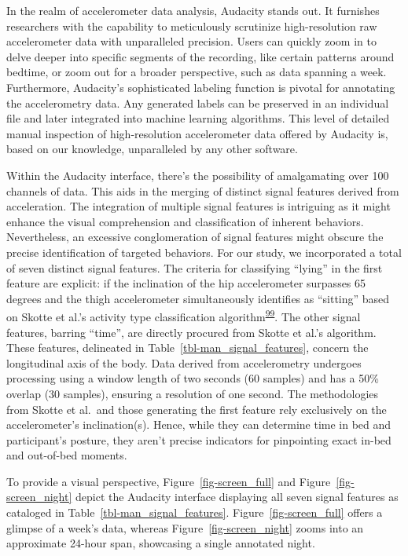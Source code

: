 \documentclass[
  9pt,
]{scrbook}
\begin{document}
In the realm of accelerometer data analysis, Audacity stands out. It
furnishes researchers with the capability to meticulously scrutinize
high-resolution raw accelerometer data with unparalleled precision.
Users can quickly zoom in to delve deeper into specific segments of the
recording, like certain patterns around bedtime, or zoom out for a
broader perspective, such as data spanning a week. Furthermore,
Audacity's sophisticated labeling function is pivotal for annotating the
accelerometry data. Any generated labels can be preserved in an
individual file and later integrated into machine learning algorithms.
This level of detailed manual inspection of high-resolution
accelerometer data offered by Audacity is, based on our knowledge,
unparalleled by any other software.

Within the Audacity interface, there's the possibility of amalgamating
over 100 channels of data. This aids in the merging of distinct signal
features derived from acceleration. The integration of multiple signal
features is intriguing as it might enhance the visual comprehension and
classification of inherent behaviors. Nevertheless, an excessive
conglomeration of signal features might obscure the precise
identification of targeted behaviors. For our study, we incorporated a
total of seven distinct signal features. The criteria for classifying
``lying'' in the first feature are explicit: if the inclination of the
hip accelerometer surpasses 65 degrees and the thigh accelerometer
simultaneously identifies as ``sitting'' based on Skotte et al.'s
activity type classification
algorithm\textsuperscript{\protect\hyperlink{ref-skotte_detection_2014}{99}}.
The other signal features, barring ``time'', are directly procured from
Skotte et al.'s algorithm. These features, delineated in
Table~\ref{tbl-man_signal_features}, concern the longitudinal axis of
the body. Data derived from accelerometry undergoes processing using a
window length of two seconds (60 samples) and has a 50\% overlap (30
samples), ensuring a resolution of one second. The methodologies from
Skotte et al.~and those generating the first feature rely exclusively on
the accelerometer's inclination(s). Hence, while they can determine time
in bed and participant's posture, they aren't precise indicators for
pinpointing exact in-bed and out-of-bed moments.

To provide a visual perspective, Figure~\ref{fig-screen_full} and
Figure~\ref{fig-screen_night} depict the Audacity interface displaying
all seven signal features as cataloged in
Table~\ref{tbl-man_signal_features}. Figure~\ref{fig-screen_full} offers
a glimpse of a week's data, whereas Figure~\ref{fig-screen_night} zooms
into an approximate 24-hour span, showcasing a single annotated night.
\end{document}
